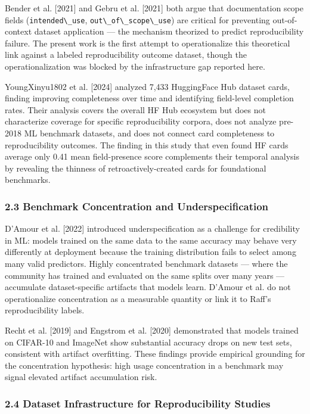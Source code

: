 Bender et al. [2021] and Gebru et al. [2021] both argue that documentation scope fields (\texttt{intended\textbackslash \_use}, \texttt{out\textbackslash \_of\textbackslash \_scope\textbackslash \_use}) are critical for preventing out-of-context dataset application --- the mechanism theorized to predict reproducibility failure. The present work is the first attempt to operationalize this theoretical link against a labeled reproducibility outcome dataset, though the operationalization was blocked by the infrastructure gap reported here.

YoungXinyu1802 et al. [2024] analyzed 7,433 HuggingFace Hub dataset cards, finding improving completeness over time and identifying field-level completion rates. Their analysis covers the overall HF Hub ecosystem but does not characterize coverage for specific reproducibility corpora, does not analyze pre-2018 ML benchmark datasets, and does not connect card completeness to reproducibility outcomes. The finding in this study that even found HF cards average only 0.41 mean field-presence score complements their temporal analysis by revealing the thinness of retroactively-created cards for foundational benchmarks.

\subsubsection{2.3 Benchmark Concentration and Underspecification}

D'Amour et al. [2022] introduced underspecification as a challenge for credibility in ML: models trained on the same data to the same accuracy may behave very differently at deployment because the training distribution fails to select among many valid predictors. Highly concentrated benchmark datasets --- where the community has trained and evaluated on the same splits over many years --- accumulate dataset-specific artifacts that models learn. D'Amour et al. do not operationalize concentration as a measurable quantity or link it to Raff's reproducibility labels.

Recht et al. [2019] and Engstrom et al. [2020] demonstrated that models trained on CIFAR-10 and ImageNet show substantial accuracy drops on new test sets, consistent with artifact overfitting. These findings provide empirical grounding for the concentration hypothesis: high usage concentration in a benchmark may signal elevated artifact accumulation risk.

\subsubsection{2.4 Dataset Infrastructure for Reproducibility Studies}

